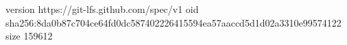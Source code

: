 version https://git-lfs.github.com/spec/v1
oid sha256:8da0b87c704ce64fd0dc587402226415594ea57aaccd5d1d02a3310e99574122
size 159612
